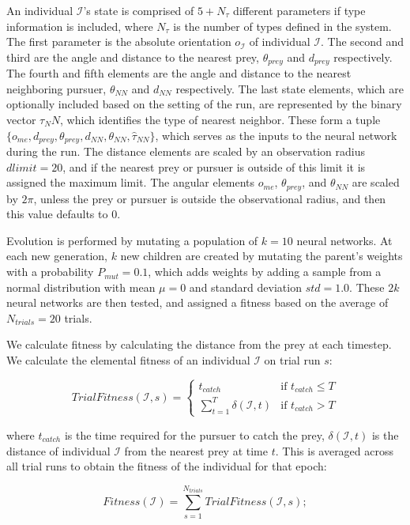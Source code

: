 \documentclass{aamas2014}
\begin{document}
An individual $\mathcal{I}$'s state is comprised of $5+N_{\tau}$ different parameters if type information is included, where $N_{\tau}$ is the number of types defined in the system. The first parameter is the absolute orientation $o_{\mathcal{I}}$ of individual $\mathcal{I}$. The second and third are the angle and distance to the nearest prey, $\theta_{prey}$ and $d_{prey}$ respectively. The fourth and fifth elements are the angle and distance to the nearest neighboring pursuer, $\theta_{NN}$ and $d_{NN}$ respectively. The last state elements, which are optionally included based on the setting of the run, are represented by the binary vector $\tau_NN$, which identifies the type of nearest neighbor. These form a tuple $\{o_{me},d_{prey},\theta_{prey},d_{NN}, \theta_{NN},\hat{\tau}_{NN}\}$, which serves as the inputs to the neural network during the run. The distance elements are scaled by an observation radius $d{limit}=20$, and if the nearest prey or pursuer is outside of this limit it is assigned the maximum limit. The angular elements $o_{me}$, $\theta_{prey}$, and $\theta_{NN}$ are scaled by $2\pi$, unless the prey or pursuer is outside the observational radius, and then this value defaults to 0.

Evolution is performed by mutating a population of $k=10$ neural networks. At each new generation, $k$ new children are created by mutating the parent's weights with a probability $P_{mut}=0.1$, which adds weights by adding a sample from a normal distribution with mean $\mu=0$ and standard deviation $std=1.0$. These $2k$ neural networks are then tested, and assigned a fitness based on the average of $N_{trials}=20$ trials.

We calculate fitness by calculating the distance from the prey at each timestep. We calculate the elemental fitness of an individual $\mathcal{I}$ on trial run $s$:


\[
 TrialFitness(\mathcal{I},s) =
  \begin{cases}
   t_{catch} & \text{if } t_{catch} \leq T \\
   \sum_{t=1}^T \delta(\mathcal{I},t)       & \text{if } t_{catch} > T
  \end{cases}
\]

where $t_{catch}$ is the time required for the pursuer to catch the prey, $\delta(\mathcal{I},t)$ is the distance of individual $\mathcal{I}$ from the nearest prey at time $t$. This is averaged across all trial runs to obtain the fitness of the individual for that epoch:

\begin{equation*}
Fitness(\mathcal{I}) = \sum_{s=1}^{N_{trials}} TrialFitness(\mathcal{I},s);
\end{equation*}
\end{document}
